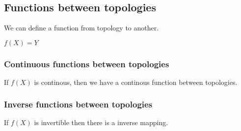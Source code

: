 
\subsection{Functions between topologies}

We can define a function from topology to another.

\(f(X)=Y\)

\subsubsection{Continuous functions between topologies}

If \(f(X)\) is continous, then we have a continous function between topologies.

\subsubsection{Inverse functions between topologies}

If \(f(X)\) is invertible then there is a inverse mapping.

